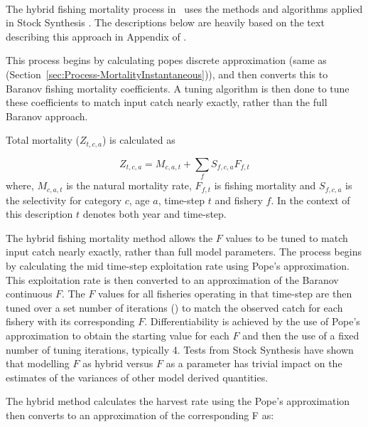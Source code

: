 \paragraph{}\label{sec:Process-MortalityHybrid} 

The hybrid fishing mortality process in \CNAME\ uses the methods and algorithms applied in Stock Synthesis \citep{methot2013stock}. The descriptions below are heavily based on the text describing this approach in Appendix of \cite{methot2013stock}.

This process begins by calculating popes discrete approximation (same as  (Section~\ref{sec:Process-MortalityInstantaneous})), and then converts this to Baranov fishing mortality coefficients. A tuning algorithm is then done to tune these coefficients to match input catch nearly exactly, rather than the full Baranov approach.

Total mortality (\(Z_{t,c,a}\)) is calculated as

\begin{equation*}
	Z_{t,c,a} = M_{c,a,t} + \sum\limits_{f} S_{f,c,a} F_{f,t}
\end{equation*}
%
where, \( M_{c,a,t}\) is the natural mortality rate, \( F_{f,t}\) is fishing mortality and \(S_{f,c,a}\) is the selectivity for category \(c\), age \(a\), time-step \(t\) and fishery \(f\). In the context of this description \(t\) denotes both year and time-step.

The hybrid fishing mortality method allows the \(F\) values to be tuned to match input catch nearly exactly, rather than full model parameters. The process begins by calculating the mid time-step exploitation rate using Pope’s approximation. This exploitation rate is then converted to an approximation of the Baranov continuous \(F\). The \(F\) values for all fisheries operating in that time-step are then tuned over a set number of iterations () to match the observed catch for each fishery with its corresponding \(F\). Differentiability is achieved by the use of Pope's approximation to obtain the starting value for each \(F\) and then the use of a fixed number of tuning iterations, typically 4. Tests from Stock Synthesis have shown that modelling \(F\) as hybrid versus \(F\) as a parameter has trivial impact on the estimates of the variances of other model derived quantities. 

The hybrid method calculates the harvest rate using the Pope's approximation then converts to an approximation of the corresponding F as:

